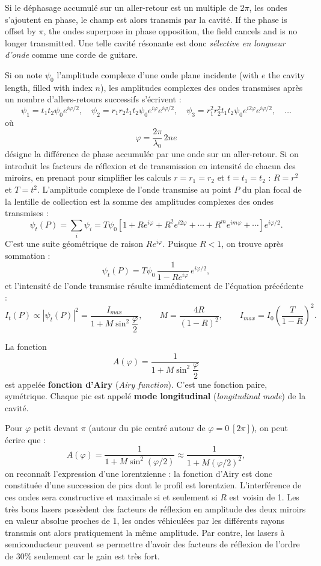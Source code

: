 \begin{prop}
  Si le déphasage accumulé sur un aller-retour est un multiple de $2\pi$, les
  ondes s'ajoutent en phase, le champ est alors transmis par la cavité. If the
  phase is offset by $\pi$, the ondes superpose in phase opposition, the field
  cancels and is no longer transmitted. Une telle cavité résonante est donc
  \emph{sélective en longueur d'onde} comme une corde de guitare.
\end{prop}

\noindent Si on note $\psi_0$ l'amplitude complexe d'une onde plane incidente
(with $e$ the cavity length, filled with index $n$), les amplitudes complexes
des ondes transmises après un nombre d'allers-retours successifs s'écrivent :
\[\psi_1=t_1t_2\psi_0e^{i\varphi/2},\quad
  \psi_2=r_1r_2t_1t_2\psi_0e^{i\varphi}e^{i\varphi/2},\quad
  \psi_3=r_1^2r_2^2t_1t_2\psi_0e^{i2\varphi}e^{i\varphi/2},\quad\ldots\]
où
\[\varphi=\frac{2\pi}{\lambda_0}\,2ne\]
désigne la différence de phase accumulée par une onde sur un aller-retour. Si on
introduit les facteurs de réflexion et de transmission en intensité de chacun
des miroirs, en prenant pour simplifier les calculs $r=r_1=r_2$ et $t=t_1=t_2$ :
$R=r^2$ et $T=t^2$. L'amplitude complexe de l'onde transmise au point $P$ du
plan focal de la lentille de collection est la somme des amplitudes complexes des ondes
transmises :
\[\psi_t(P)=\sum_i\psi_i
  =T\psi_0\left[1+Re^{i\varphi}+R^2e^{i2\varphi}+\cdots+R^me^{im\varphi}
  +\cdots\right]e^{i\varphi/2}.\]
C'est une suite géométrique de raison $Re^{i\varphi}$. Puisque $R<1$, on trouve
après sommation :
\[\psi_t(P)=T\psi_0\,\frac{1}{1-Re^{i\varphi}}\,e^{i\varphi/2},\]
et l'intensité de l'onde transmise résulte immédiatement de l'équation
précédente :
\[I_t(P)\propto\left|\psi_t(P)\right|^2
  =\frac{I_{max}}{1+M\sin^2\dfrac{\varphi}{2}},\qquad
  M=\frac{4R}{(1-R)^2},\qquad
  I_{max}=I_0\left(\frac{T}{1-R}\right)^2.\]

\begin{definition}
  La fonction
  \[A(\varphi)=\frac{1}{1+M\sin^2\dfrac{\varphi}{2}}\]
  est appelée \textbf{fonction d'Airy} (\textit{Airy function}). C'est une
  fonction paire, symétrique. Chaque pic est appelé \textbf{mode longitudinal}
  (\textit{longitudinal mode}) de la cavité.
\end{definition}

Pour $\varphi$ petit devant $\pi$ (autour du pic centré autour de
$\varphi=0\ [2\pi]$), on peut écrire que :
\[A(\varphi)=\frac{1}{1+M\sin^2\left(\varphi/2\right)}
  \approx\frac{1}{1+M\left(\varphi/2\right)^2},\]
on reconnaît l'expression d'une lorentzienne : la fonction d'Airy est donc
constituée d'une succession de pics dont le profil est lorentzien.
L'interférence de ces ondes sera constructive et maximale si et seulement si $R$
est voisin de 1. Les très bons lasers possèdent des facteurs de réflexion en
amplitude des deux miroirs en valeur absolue proches de 1, les ondes véhiculées
par les différents rayons transmis ont alors pratiquement la même amplitude. Par
contre, les lasers à semiconducteur peuvent se permettre d'avoir des facteurs de
réflexion de l'ordre de 30\% seulement car le gain est très fort.

